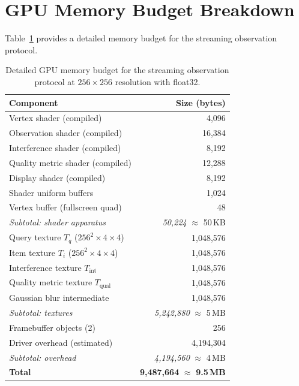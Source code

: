 \documentclass[11pt,twocolumn,a4paper]{article}
\begin{document}
\section{GPU Memory Budget Breakdown}
\label{app:memory}

Table~\ref{tab:memory} provides a detailed memory budget for the
streaming observation protocol.

\begin{table}[H]
\centering
\caption{Detailed GPU memory budget for the streaming observation
protocol at $256 \times 256$ resolution with float32.}
\label{tab:memory}
\begin{tabular}{lr}
\toprule
\textbf{Component} & \textbf{Size (bytes)} \\
\midrule
Vertex shader (compiled) & 4,096 \\
Observation shader (compiled) & 16,384 \\
Interference shader (compiled) & 8,192 \\
Quality metric shader (compiled) & 12,288 \\
Display shader (compiled) & 8,192 \\
Shader uniform buffers & 1,024 \\
Vertex buffer (fullscreen quad) & 48 \\
\midrule
\textit{Subtotal: shader apparatus} & \textit{50,224}
  $\approx$ 50\,KB \\
\midrule
Query texture $T_q$ ($256^2 \times 4 \times 4$) & 1,048,576 \\
Item texture $T_i$ ($256^2 \times 4 \times 4$) & 1,048,576 \\
Interference texture $T_{\mathrm{int}}$ & 1,048,576 \\
Quality metric texture $T_{\mathrm{qual}}$ & 1,048,576 \\
Gaussian blur intermediate & 1,048,576 \\
\midrule
\textit{Subtotal: textures} & \textit{5,242,880}
  $\approx$ 5\,MB \\
\midrule
Framebuffer objects (2) & 256 \\
Driver overhead (estimated) & 4,194,304 \\
\midrule
\textit{Subtotal: overhead} & \textit{4,194,560}
  $\approx$ 4\,MB \\
\midrule
\textbf{Total} & \textbf{9,487,664}
  $\approx$ \textbf{9.5\,MB} \\
\bottomrule
\end{tabular}
\end{table}
\end{document}

